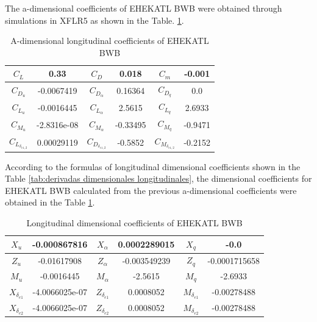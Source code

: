 The a-dimensional coefficients of EHEKATL BWB were obtained through simulations in XFLR5 as shown in the Table. \ref{Coeficientes a-dimensionales longitudinales de EHEKATL BWB}. 
\begin{table}[!h]
    \centering
    \begin{tabular}{|cc|cc|cc|}
    \hline
     $C_L$ & 0.33 & $C_D$ & 0.018 & $C_m$ & -0.001 \\
     \hline
     $C_{D_u}$ & -0.0067419 & $C_{D_\alpha}$ & 0.16364 & $C_{D_q}$ & 0.0 \\
     \hline
     $C_{L_u}$ & -0.0016445 & $C_{L_\alpha}$ & 2.5615 & $C_{L_q}$ & 2.6933 \\
     \hline
     $C_{M_u}$ & -2.8316e-08 & $C_{M_\alpha}$ & -0.33495 & $C_{M_q}$ & -0.9471 \\
     \hline
     $C_{L_{\delta_{e1,2}}}$ & 0.00029119 & $C_{D_{\delta_{e1,2}}}$ & -0.5852 & $C_{M_{\delta_{e1,2}}}$ & -0.2152 \\
     \hline
    \end{tabular}
    \caption{A-dimensional longitudinal coefficients of EHEKATL BWB}
    \label{Coeficientes a-dimensionales longitudinales de EHEKATL BWB}
\end{table}

According to the formulas of longitudinal dimensional coefficients shown in the Table \ref{tab:derivadas dimensionales longitudinales}, the dimensional coefficients for EHEKATL BWB calculated from the previous a-dimensional coefficients were obtained in the Table \ref{Coeficientes a-dimensionales longitudinales de EHEKATL BWB}. 

\begin{table}[!h]
    \centering
    \begin{tabular}{|cc|cc|cc|}
    \hline
     $X_u$ & -0.000867816 & $X_\alpha$ & 0.0002289015 & $X_q$ & -0.0 \\
     \hline
     $Z_u$ & -0.01617908 & $Z_\alpha$ & -0.003549239 & $Z_q$ & -0.0001715658 \\
     \hline
     $M_u$ & -0.0016445 & $M_\alpha$ & -2.5615 & $M_q$ & -2.6933 \\
     \hline
     $X_{\delta_{e1}}$ & -4.0066025e-07 & $Z_{\delta_{e1}}$ & 0.0008052 & $M_{\delta_{e1}}$ & -0.00278488 \\
     \hline
     $X_{\delta_{e2}}$ & -4.0066025e-07 & $Z_{\delta_{e2}}$ & 0.0008052 & $M_{\delta_{e2}}$ & -0.00278488 \\
     \hline
    \end{tabular}
    \caption{Longitudinal dimensional coefficients of EHEKATL BWB}
    \label{Coeficientes dimensionales longitudinales de EHEKATL BWB}
\end{table}

